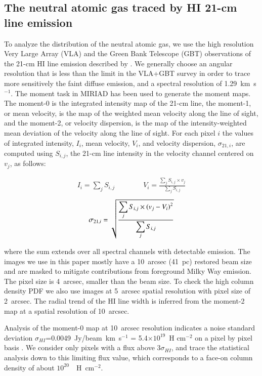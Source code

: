 \documentclass{aa}
\begin{document}
\subsection{The neutral atomic gas  traced by HI  21-cm line emission }

To analyze the distribution of  the neutral atomic gas, we use the high resolution
Very Large Array (VLA) and the Green Bank Telescope (GBT) observations of the 21-cm HI line 
emission described by \citet{2014A&A...572A..23C}.
We generally choose an angular resolution that is less than the limit in the
VLA+GBT survey in order to trace more sensitively the faint diffuse emission, and a 
spectral  resolution of 1.29~km~s$^{-1}$. The moment task in MIRIAD has been used to
generate the moment maps. 
The moment-0  is the integrated intensity map of the 21-cm line, 
the moment-1, or mean velocity, is the map of the weighted mean velocity along the line of sight, 
and the moment-2, or   velocity
dispersion, is the map of the intensity-weighted mean deviation of the velocity along the line of sight.
For each pixel $i$ the values of integrated intensity, $I_i$,
mean velocity, $V_i$, and velocity dispersion, $\sigma_{21,i}$,  are computed using $S_{i,j}$, the 21-cm line
intensity in the velocity channel centered on $v_j$,  as follows: 
  
\begin{eqnarray}
 I_i = \sum_j S_{i,j} \qquad \qquad V_i =  \frac {\displaystyle \sum_j S_{i,j}\times v_j}  {\displaystyle \sum_j S_{i,j}}  
 \end{eqnarray}
 \begin{eqnarray}
\sigma_{21,i} = \sqrt{{\displaystyle\sum_j S_{i,j}\times (v_j-V_i)^2 \over \displaystyle\sum_j S_{i,j} } }  
\end{eqnarray}

\noindent
where the sum  extends over all spectral channels with detectable emission.
The images we  use in this paper mostly have a 10~arcsec (41~pc) restored 
beam size and are masked to mitigate contributions from foreground Milky Way emission.  
The pixel size is 4~arcsec, smaller than the beam size.
To check the high column density PDF we also use images at 5~arcsec spatial resolution
with pixel size of 2~arcsec.
The radial trend of the HI line width is inferred from the moment-2
map at a spatial resolution of 10~arcsec.

Analysis of the moment-0 map at 10~arcsec resolution indicates a noise standard
deviation $\sigma_{HI}$=0.0049~Jy/beam~km~s$^{-1}$ = 5.4$ \times 10^{19}$~H cm$^{-2}$
on a pixel by pixel basis . We
consider only pixels with a flux above $3\sigma_{HI}$,
and trace the statistical analysis down to this limiting flux value, which corresponds to a face-on
column density of about  $10^{20}$~~H~cm$^{-2}$.
\end{document}
